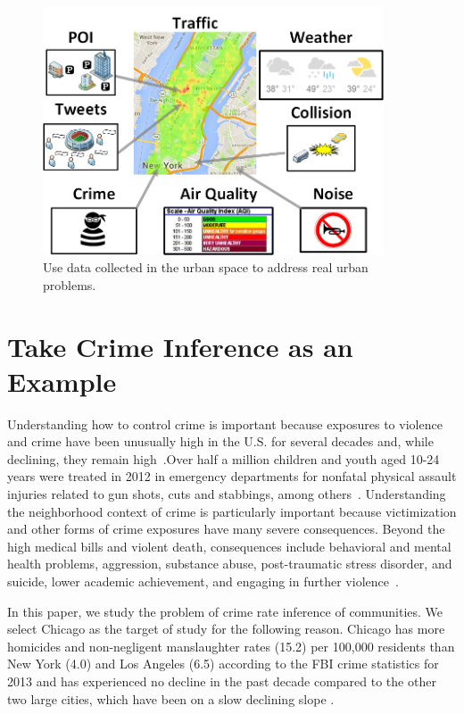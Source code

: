 \begin{figure}[h]
\centering
\includegraphics[width=0.9\textwidth]{fig/intro-data.png}
\caption{Use data collected in the urban space to address real urban problems.}
\label{fig:demo-data}
\end{figure}



\section{Take Crime Inference as an Example}

Understanding how to control crime is important because exposures to violence and crime have been unusually high in the U.S. for several decades and, while declining, they remain high~\cite{Baum05, Fink08}.Over half a million children and youth aged 10-24 years were treated in 2012 in emergency departments for nonfatal physical assault injuries related to gun shots, cuts and stabbings, among others~\cite{cdc15}.  Understanding the neighborhood context of crime is particularly important because victimization and other forms of crime exposures have many severe consequences.  Beyond the high medical bills and violent death, consequences include behavioral and mental health problems, aggression, substance abuse, post-traumatic stress disorder, and suicide, lower academic achievement, and engaging in further violence~\cite{Grai15}. 

In this paper, we study the problem of crime rate inference of communities. We select Chicago as the target of study for the following reason. Chicago has more homicides and non-negligent manslaughter rates (15.2)
per 100,000 residents than New York (4.0) and Los Angeles (6.5)
according to the FBI crime statistics for 2013 and has experienced no
decline in the past decade compared to the other two large cities,
which have been on a slow declining slope \cite{crime-stats}.


